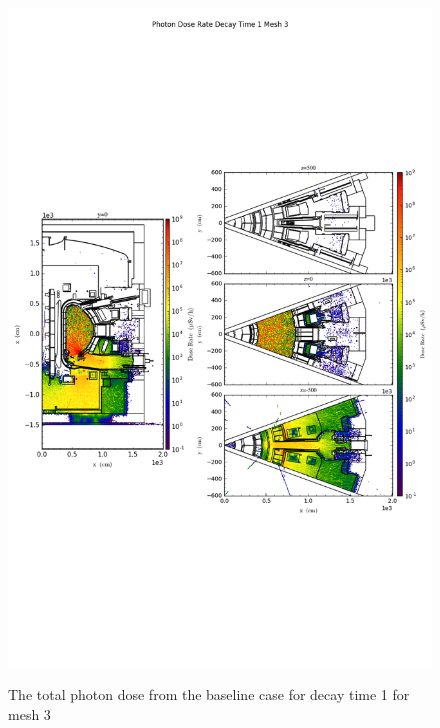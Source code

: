 \begin{figure}[ht!]
\centering
\includegraphics[trim={0cm 9cm 0cm 10cm},clip,scale=0.75]{../plots/final_model_nob4c/Photon_Dose_Rate_Decay_Time_1_Mesh_3.png}
\label{fig:photons_dc1_no4bc_m3_flux}
\caption{The total photon dose from the baseline case for decay time 1 for mesh 3}
\end{figure}
